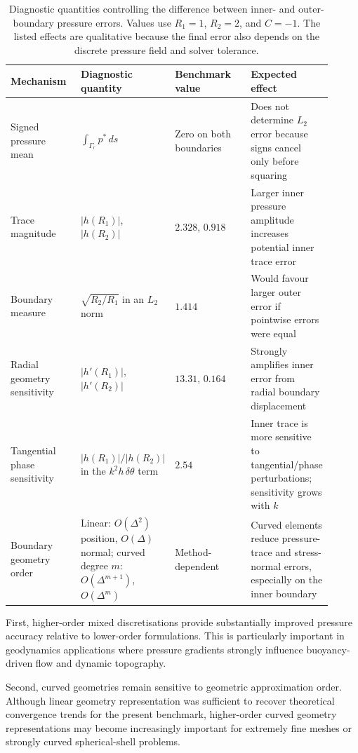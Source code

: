 \documentclass[gmd, manuscript]{copernicus}
\begin{document}
\begin{table}[H]
\centering
\caption{Diagnostic quantities controlling the difference between inner- and
outer-boundary pressure errors. Values use \(R_1=1\), \(R_2=2\), and \(C=-1\).
The listed effects are qualitative because the final error also depends on the
discrete pressure field and solver tolerance.}
\label{tab:boundary_pressure_error_mechanisms}
\scriptsize
\setlength{\tabcolsep}{3pt}
\begin{tabular}{p{0.22\linewidth}p{0.25\linewidth}p{0.24\linewidth}p{0.20\linewidth}}
\toprule
Mechanism & Diagnostic quantity & Benchmark value & Expected effect \\
\midrule
Signed pressure mean & \(\int_{\Gamma_r} p^*\,ds\) & Zero on both boundaries & Does not determine \(L_2\) error because signs cancel only before squaring \\
Trace magnitude & \(|h(R_1)|\), \(|h(R_2)|\) & \(2.328\), \(0.918\) & Larger inner pressure amplitude increases potential inner trace error \\
Boundary measure & \(\sqrt{R_2/R_1}\) in an \(L_2\) norm & \(1.414\) & Would favour larger outer error if pointwise errors were equal \\
Radial geometry sensitivity & \(|h'(R_1)|\), \(|h'(R_2)|\) & \(13.31\), \(0.164\) & Strongly amplifies inner error from radial boundary displacement \\
Tangential phase sensitivity & \(|h(R_1)|/|h(R_2)|\) in the \(k^2 h\,\delta\theta\) term & \(2.54\) & Inner trace is more sensitive to tangential/phase perturbations; sensitivity grows with \(k\) \\
Boundary geometry order & Linear: \(O(\Delta^2)\) position, \(O(\Delta)\) normal; curved degree \(m\): \(O(\Delta^{m+1})\), \(O(\Delta^m)\) & Method-dependent & Curved elements reduce pressure-trace and stress-normal errors, especially on the inner boundary \\
\bottomrule
\end{tabular}
\end{table}

First, higher-order mixed discretisations provide substantially improved pressure accuracy relative to lower-order formulations.
This is particularly important in geodynamics applications where pressure gradients strongly influence buoyancy-driven flow and dynamic topography.

Second, curved geometries remain sensitive to geometric approximation order.
Although linear geometry representation was sufficient to recover theoretical convergence trends for the present benchmark, higher-order 
curved geometry representations may become increasingly important for extremely fine meshes or strongly curved spherical-shell problems.
\end{document}
